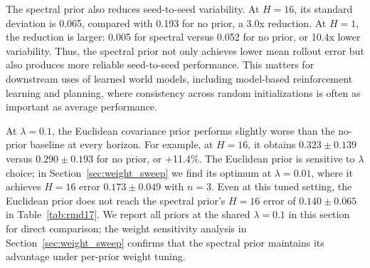 The spectral prior also reduces seed-to-seed variability. At \(H=16\), its standard deviation is 0.065, compared with 0.193 for no prior, a 3.0x reduction. At \(H=1\), the reduction is larger: 0.005 for spectral versus 0.052 for no prior, or 10.4x lower variability. Thus, the spectral prior not only achieves lower mean rollout error but also produces more reliable seed-to-seed performance. This matters for downstream uses of learned world models, including model-based reinforcement learning and planning, where consistency across random initializations is often as important as average performance.

At \(\lambda=0.1\), the Euclidean covariance prior performs slightly worse than the no-prior baseline at every horizon. For example, at \(H=16\), it obtains \(0.323 \pm 0.139\) versus \(0.290 \pm 0.193\) for no prior, or +11.4\%. The Euclidean prior is sensitive to \(\lambda\) choice; in Section~\ref{sec:weight_sweep} we find its optimum at \(\lambda=0.01\), where it achieves \(H=16\) error \(0.173 \pm 0.049\) with \(n=3\). Even at this tuned setting, the Euclidean prior does not reach the spectral prior's \(H=16\) error of \(0.140 \pm 0.065\) in Table~\ref{tab:rmd17}. We report all priors at the shared \(\lambda=0.1\) in this section for direct comparison; the weight sensitivity analysis in Section~\ref{sec:weight_sweep} confirms that the spectral prior maintains its advantage under per-prior weight tuning.
